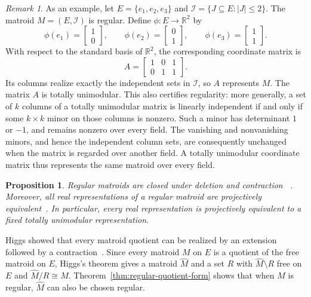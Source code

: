 \documentclass[11pt]{article}
\numberwithin{equation}{section}
\newtheorem{proposition}[definition]{Proposition}
\theoremstyle{remark}
\newtheorem{remark}[definition]{Remark}
\begin{document}
\begin{remark}
As an example, let $E=\{e_1,e_2,e_3\}$ and
$\mathcal I=\{J\subseteq E:|J|\leq 2\}$. The matroid
$M=(E,\mathcal I)$ is regular. Define
$\phi:E\to\mathbb R^2$ by
\begin{equation}
    \phi(e_1)=
    \begin{bmatrix}1\\0\end{bmatrix},
    \qquad
    \phi(e_2)=
    \begin{bmatrix}0\\1\end{bmatrix},
    \qquad
    \phi(e_3)=
    \begin{bmatrix}1\\1\end{bmatrix}.
\end{equation}
With respect to the standard basis of $\mathbb R^2$, the corresponding
coordinate matrix is
\begin{equation}
    A=
    \begin{bmatrix}
        1 & 0 & 1\\
        0 & 1 & 1
    \end{bmatrix}.
\end{equation}
Its columns realize exactly the independent sets in $\mathcal I$, so $A$
represents $M$. The matrix $A$ is totally unimodular. This also certifies
regularity: more generally, a set of $k$ columns of a totally unimodular
matrix is linearly independent if and only if some $k\times k$ minor on
those columns is nonzero. Such a minor has determinant $1$ or $-1$, and
remains nonzero over every field. The vanishing and nonvanishing
minors, and hence the independent column sets, are consequently unchanged
when the matrix is regarded over another field. A totally unimodular
coordinate matrix thus represents the same matroid over every field.
\end{remark}

\begin{proposition}
\label{prop:regular-basic-properties}
Regular matroids are closed under deletion and contraction
~\cite{Oxley2011}. Moreover, all real representations of a regular matroid
are projectively equivalent~\cite{BrylawskiLucas1976,Oxley2011}. In
particular, every real representation is projectively equivalent to a fixed
totally unimodular representation.
\end{proposition}

Higgs showed that every matroid quotient can be realized by an extension
followed by a contraction~\cite{Higgs1968}. Since every matroid $M$ on $E$
is a quotient of the free matroid on $E$, Higgs's theorem gives a matroid
$\widehat M$ and a set $R$ with
$\widehat M\setminus R$ free on $E$ and
$\widehat M/R\cong M$. Theorem~\ref{thm:regular-quotient-form} shows that
when $M$ is regular, $\widehat M$ can also be chosen regular.
\end{document}
